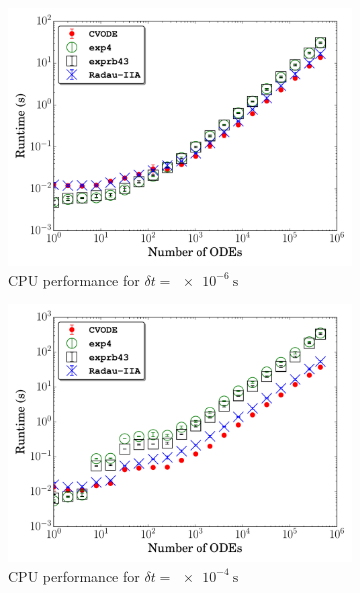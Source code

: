 \documentclass[preprint]{elsarticle}
\begin{document}
\begin{figure}[htb]
  \centering
  \begin{subfigure}{0.49\textwidth}
      \includegraphics[width=\linewidth]{CH4_1e-06_cpu_nonorm.pdf}
      \caption{CPU performance for $\delta t = \SI{e-6}{\second}$}
  \end{subfigure}
  \begin{subfigure}{0.49\textwidth}
      \includegraphics[width=\linewidth]{CH4_1e-04_cpu_nonorm.pdf}
      \caption{CPU performance for $\delta t = \SI{e-4}{\second}$}
  \end{subfigure}\\
  \begin{subfigure}{0.49\textwidth}

\end{subfigure}
\end{figure}
\end{document}

